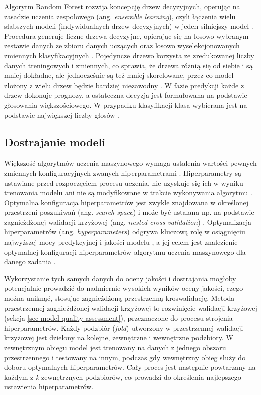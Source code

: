 \documentclass{amuthesis}
\begin{document}
Algorytm Random Forest rozwija koncepcję drzew decyzyjnych, operując na
zasadzie uczenia zespołowego (ang. \emph{ensemble learning}), czyli
łączenia wielu słabszych modeli (indywidualnych drzew decyzyjnych) w
jeden silniejszy model
\autocite{aaron_2018_ml,sekulic_2020_rf_interpolation}. Procedura
generuje liczne drzewa decyzyjne, opierając się na losowo wybranym
zestawie danych ze zbioru danych uczących oraz losowo wyselekcjonowanych
zmiennych klasyfikacyjnych \autocite{breiman_2001_rf}. Pojedyncze drzewo
korzysta ze zredukowanej liczby danych treningowych i zmiennych, co
sprawia, że drzewa różnią się od siebie i są mniej dokładne, ale
jednocześnie są też mniej skorelowane, przez co model złożony z wielu
drzew będzie bardziej niezawodny
\autocite{sekulic_2020_rf_interpolation}. W fazie predykcji każde z
drzew dokonuje prognozy, a ostateczna decyzja jest formułowana na
podstawie głosowania większościowego. W przypadku klasyfikacji klasa
wybierana jest na podstawie największej liczby głosów
\autocite{breiman_2001_rf}.

\hypertarget{sec-tuning}{%
\subsection{Dostrajanie modeli}\label{sec-tuning}}

Większość algorytmów uczenia maszynowego wymaga ustalenia wartości
pewnych zmiennych konfiguracyjnych zwanych hiperparametrami
\autocite{krol_2022_podstawy_ml}. Hiperparametry są ustawiane przed
rozpoczęciem procesu uczenia, nie uzyskuje się ich w wyniku trenowania
modelu ani nie są modyfikowane w trakcie wykonywania algorytmu
\autocite{krol_2022_podstawy_ml}. Optymalna konfiguracja hiperparametrów
jest zwykle znajdowana w określonej przestrzeni poszukiwań (ang.
\emph{search space}) i może być ustalana np. na podstawie zagnieżdżonej
walidacji krzyżowej (ang. \emph{nested cross-validation})
\autocite{lovelace_2019_geocomputation}. Optymalizacja hiperparametrów
(ang. \emph{hyperparameters}) odgrywa kluczową rolę w osiągnięciu
najwyższej mocy predykcyjnej i jakości modelu
\autocite{schratz_2019_hyperparameters}, a jej celem jest znalezienie
optymalnej konfiguracji hiperparametrów algorytmu uczenia maszynowego
dla danego zadania \autocite{bischl_2024_mlr3}.

Wykorzystanie tych samych danych do oceny jakości i dostrajania mogłoby
potencjalnie prowadzić do nadmiernie wysokich wyników oceny jakości,
czego można uniknąć, stosując zagnieżdżoną przestrzenną kroswalidację.
Metoda przestrzennej zagnieżdżonej walidacji krzyżowej to rozwinięcie
walidacji krzyżowej (sekcja \ref{sec-model-quality-assessment}),
przeznaczone do procesu strojenia hiperparametrów. Każdy podzbiór
(\emph{fold}) utworzony w przestrzennej walidacji krzyżowej jest
dzielony na kolejne, zewnętrzne i wewnętrzne podzbiory. W zewnętrznym
obiegu model jest trenowany na danych z jednego obszaru przestrzennego i
testowany na innym, podczas gdy wewnętrzny obieg służy do doboru
optymalnych hiperparametrów. Cały proces jest następnie powtarzany na
każdym z \emph{k} zewnętrznych podzbiorów, co prowadzi do określenia
najlepszego ustawienia hiperparametrów.
\end{document}
